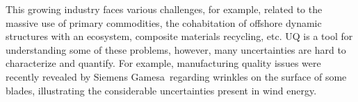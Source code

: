 This growing industry faces various challenges, for example, related to the massive use of primary commodities, the cohabitation of offshore dynamic structures with an ecosystem, composite materials recycling, etc. 
UQ is a tool for understanding some of these problems, however, many uncertainties are hard to characterize and quantify. 
For example, manufacturing quality issues were recently revealed by Siemens Gamesa\footnotemark~regarding wrinkles on the surface of some blades, illustrating the considerable uncertainties present in wind energy. 



